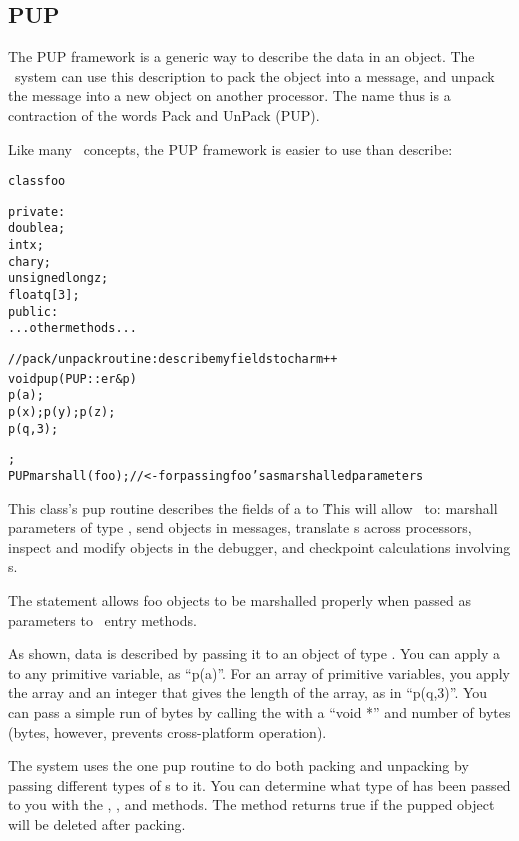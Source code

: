 \subsection{PUP}

The  PUP framework is a generic way to describe the data in an object.
The \charmpp\ system can use this description to pack the object 
into a message, and unpack the message into a new object on another 
processor.
The name thus is a contraction of the words Pack and UnPack (PUP).

Like many \CC\ concepts, the PUP framework is easier to use than 
describe: 

\begin{alltt}
class foo {
 private:
    double a;
    int x;
    char y;
    unsigned long z;
    float q[3];
 public:
    ...other methods...

    //pack/unpack routine: describe my fields to charm++
    void pup(PUP::er &p) {
      p(a);
      p(x);p(y);p(z);
      p(q,3);
    }
};
PUPmarshall(foo); //<- for passing foo's as marshalled parameters
\end{alltt}

This class's pup routine describes the fields of a  to \charmpp\.
This will allow \charmpp\ to: marshall parameters of type ,
send  objects in messages, translate s across processors,
inspect and modify  objects in the debugger, and checkpoint 
calculations involving s.

The  statement allows foo objects to be
marshalled properly when passed as parameters to \charmpp\ entry methods.

As shown, data is described by passing it to an object of type 
 .  You can apply a  to any 
primitive variable, as ``p(a)''.
For an array of primitive variables, you apply the array and an integer
that gives the length of the array, as in ``p(q,3)''.  You can pass a 
simple run of bytes 
by calling the  with a ``void *'' and number of bytes
(bytes, however, prevents cross-platform operation).

The system uses the one pup routine to do both packing and unpacking by
passing different types of s to it.  You can determine
what type of  has been passed to you with the
, , and  methods.
The  method returns true if the pupped object
will be deleted after packing.

